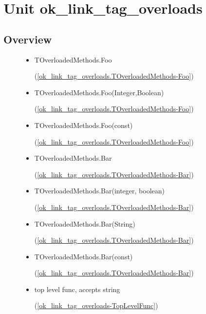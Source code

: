 \documentclass{report}
\begin{document}
\label{toc}\tableofcontents
\newpage
\newlength{\tmplength}
\chapter{Unit ok{\_}link{\_}tag{\_}overloads}
\label{ok_link_tag_overloads}
\section{Overview}
\begin{description}
\item[\texttt{\begin{ttfamily}TLinkHolder\end{ttfamily} Class}]\begin{itemize}
\item \begin{ttfamily}TOverloadedMethods.Foo\end{ttfamily}(\ref{ok_link_tag_overloads.TOverloadedMethods-Foo})
\item \begin{ttfamily}TOverloadedMethods.Foo(Integer,Boolean)\end{ttfamily}(\ref{ok_link_tag_overloads.TOverloadedMethods-Foo})
\item \begin{ttfamily}TOverloadedMethods.Foo(const)\end{ttfamily}(\ref{ok_link_tag_overloads.TOverloadedMethods-Foo})
\item \begin{ttfamily}TOverloadedMethods.Bar\end{ttfamily}(\ref{ok_link_tag_overloads.TOverloadedMethods-Bar})
\item \begin{ttfamily}TOverloadedMethods.Bar(integer, boolean)\end{ttfamily}(\ref{ok_link_tag_overloads.TOverloadedMethods-Bar})
\item \begin{ttfamily}TOverloadedMethods.Bar(String)\end{ttfamily}(\ref{ok_link_tag_overloads.TOverloadedMethods-Bar})
\item \begin{ttfamily}TOverloadedMethods.Bar(const)\end{ttfamily}(\ref{ok_link_tag_overloads.TOverloadedMethods-Bar})
\item \begin{ttfamily}top level func, accepts string\end{ttfamily}(\ref{ok_link_tag_overloads-TopLevelFunc})

\end{itemize}
\end{description}
\end{document}
